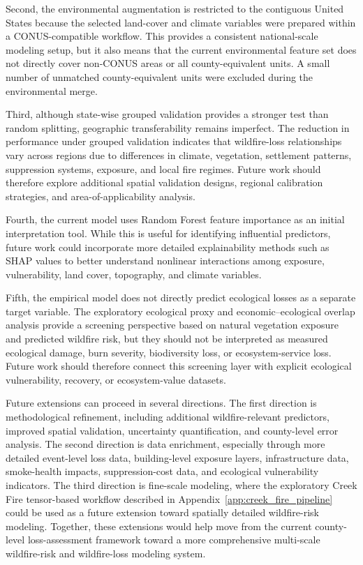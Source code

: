 Second, the environmental augmentation is restricted to the contiguous United States because the selected land-cover and climate variables were prepared within a CONUS-compatible workflow. This provides a consistent national-scale modeling setup, but it also means that the current environmental feature set does not directly cover non-CONUS areas or all county-equivalent units. A small number of unmatched county-equivalent units were excluded during the environmental merge.

Third, although state-wise grouped validation provides a stronger test than random splitting, geographic transferability remains imperfect. The reduction in performance under grouped validation indicates that wildfire-loss relationships vary across regions due to differences in climate, vegetation, settlement patterns, suppression systems, exposure, and local fire regimes. Future work should therefore explore additional spatial validation designs, regional calibration strategies, and area-of-applicability analysis.

Fourth, the current model uses Random Forest feature importance as an initial interpretation tool. While this is useful for identifying influential predictors, future work could incorporate more detailed explainability methods such as SHAP values to better understand nonlinear interactions among exposure, vulnerability, land cover, topography, and climate variables.

Fifth, the empirical model does not directly predict ecological losses as a separate target variable. The exploratory ecological proxy and economic--ecological overlap analysis provide a screening perspective based on natural vegetation exposure and predicted wildfire risk, but they should not be interpreted as measured ecological damage, burn severity, biodiversity loss, or ecosystem-service loss. Future work should therefore connect this screening layer with explicit ecological vulnerability, recovery, or ecosystem-value datasets.

Future extensions can proceed in several directions. The first direction is methodological refinement, including additional wildfire-relevant predictors, improved spatial validation, uncertainty quantification, and county-level error analysis. The second direction is data enrichment, especially through more detailed event-level loss data, building-level exposure layers, infrastructure data, smoke-health impacts, suppression-cost data, and ecological vulnerability indicators. The third direction is fine-scale modeling, where the exploratory Creek Fire tensor-based workflow described in Appendix~\ref{app:creek_fire_pipeline} could be used as a future extension toward spatially detailed wildfire-risk modeling. Together, these extensions would help move from the current county-level loss-assessment framework toward a more comprehensive multi-scale wildfire-risk and wildfire-loss modeling system.